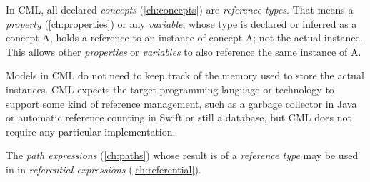 In CML, all declared \emph{concepts} (\ref{ch:concepts}) are \emph{reference types}.
That means a \emph{property} (\ref{ch:properties}) or any \emph{variable},
whose type is declared or inferred as a concept A, holds a reference
to an instance of concept A; not the actual instance.
This allows other \emph{properties} or \emph{variables}
to also reference the same instance of A.

Models in CML do not need to keep track of the memory used
to store the actual instances.
CML expects the target programming language or technology
to support some kind of reference management,
such as a garbage collector in Java or automatic reference counting in Swift
or still a database,
but CML does not require any particular implementation.

The \emph{path expressions} (\ref{ch:paths})
whose result is of a \emph{reference type} may be used
in in \emph{referential expressions} (\ref{ch:referential}).
